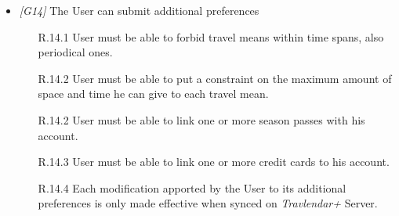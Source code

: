 \begin{itemize}
	\item \textit{[G14]} The User can submit additional preferences
		\begin{itemize}
			\item[R.14.1] User must be able to forbid travel means within time spans, also periodical ones.
			\item[R.14.2] User must be able to put a constraint on the maximum amount of space and time he can give to each travel mean.
			\item[R.14.2] User must be able to link one or more season passes with his account.
			\item[R.14.3] User must be able to link one or more credit cards to his account.
			\item[R.14.4] Each modification apported by the User to its additional preferences is only made effective when synced on \textit{Travlendar+} Server.
		\end{itemize}
		
\end{itemize}
            
\vfill
